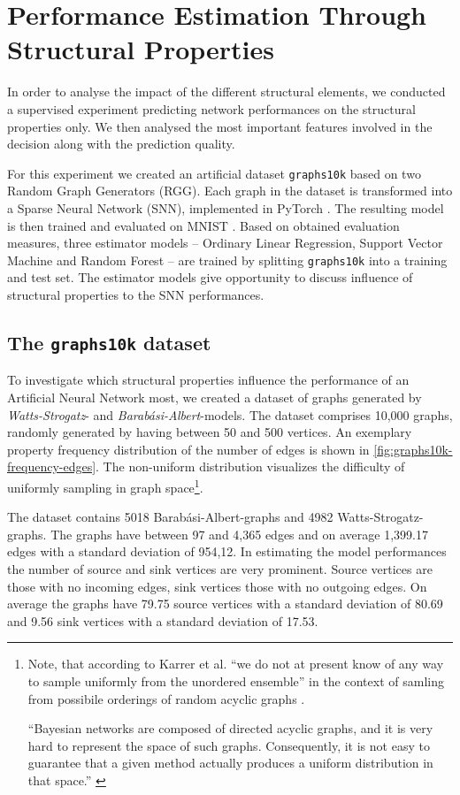 \documentclass[runningheads]{llncs}
\begin{document}
\section{Performance Estimation Through Structural Properties}
In order to analyse the impact of the different structural elements, we conducted a supervised experiment predicting network performances on the structural properties only.
We then analysed the most important features involved in the decision along with the prediction quality.

For this experiment we created an artificial dataset \texttt{graphs10k} based on two Random Graph Generators (RGG).
Each graph in the dataset is transformed into a Sparse Neural Network (SNN), implemented in PyTorch \cite{paszke2017automatic}.
The resulting model is then trained and evaluated on MNIST \cite{lecun1998mnist}.
Based on obtained evaluation measures, three estimator models -- Ordinary Linear Regression, Support Vector Machine and Random Forest -- are trained by splitting \texttt{graphs10k} into a training and test set.
The estimator models give opportunity to discuss influence of structural properties to the SNN performances.


\subsection{The \texttt{graphs10k} dataset}
To investigate which structural properties influence the performance of an Artificial Neural Network most, we created a dataset of graphs generated by \textit{Watts-Strogatz}- and \textit{Barabási-Albert}-models.
The dataset comprises 10,000 graphs, randomly generated by having between 50 and 500 vertices.
An exemplary property frequency distribution of the number of edges is shown in \autoref{fig:graphs10k-frequency-edges}.
The non-uniform distribution visualizes the difficulty of uniformly sampling in graph space\footnote{Note, that according to Karrer et al. ``we do not at present know of any way to sample uniformly from the unordered ensemble'' in the context of samling from possibile orderings of random acyclic graphs \cite{karrer2009random2}.

``Bayesian networks are composed of directed acyclic graphs, and it is very hard to represent the space of such graphs. Consequently, it is not easy to guarantee that a given method actually produces a uniform distribution in that space.'' \cite{ide2002random}}.

The dataset contains 5018 Barabási-Albert-graphs and 4982 Watts-Strogatz-graphs.
The graphs have between 97 and 4,365 edges and on average 1,399.17 edges with a standard deviation of 954,12.
In estimating the model performances the number of source and sink vertices are very prominent.
Source vertices are those with no incoming edges, sink vertices those with no outgoing edges.
On average the graphs have 79.75 source vertices with a standard deviation of 80.69 and 9.56 sink vertices with a standard deviation of 17.53.
\end{document}
